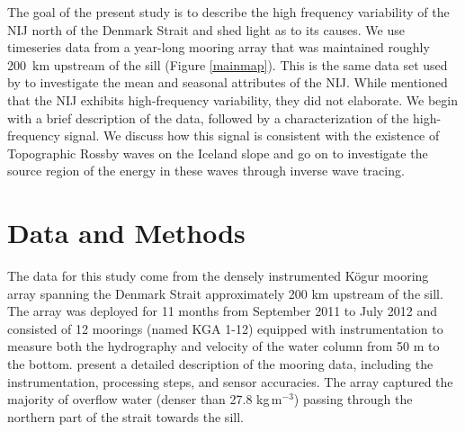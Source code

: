 \documentclass[12pt,titlepage,figuresatend]{article}
\begin{document}
The goal of the present study is to describe the high frequency variability of the NIJ north of the Denmark Strait and shed light as to its causes. We use timeseries data from a year-long mooring array that was maintained roughly 200~km upstream of the sill (Figure \ref{mainmap}). This is the same data set used by \cite{Harden2016} to investigate the mean and seasonal attributes of the NIJ. While \cite{Harden2016} mentioned that the NIJ exhibits high-frequency variability, they did not elaborate. We begin with a brief description of the data, followed by a characterization of the high-frequency signal. We discuss how this signal is consistent with the existence of Topographic Rossby waves on the Iceland slope and go on to investigate the source region of the energy in these waves through inverse wave tracing.


\section{Data and Methods}

The data for this study come from the densely instrumented K\"{o}gur mooring array spanning the Denmark Strait approximately 200 km upstream of the sill. The array was deployed for 11 months from September 2011 to July 2012 and consisted of 12 moorings (named KGA 1-12) equipped with instrumentation to measure both the hydrography and velocity of the water column from 50 m to the bottom. \cite{Harden2016} present a detailed description of the mooring data, including the instrumentation, processing steps, and sensor accuracies. The array captured the majority of overflow water (denser than 27.8 kg$\,$m$^{-3}$) passing through the northern part of the strait towards the sill.
\end{document}
